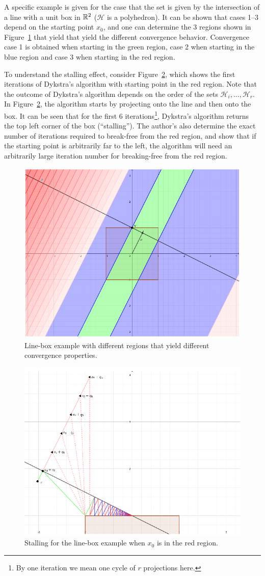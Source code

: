 \documentclass[hidelinks]{article}
\begin{document}
A specific example is given for the case that the set is given by the intersection of a line with a unit box in $\mathbb{R}^2$ ($\mathcal{H}$ is a polyhedron). It can be shown that cases 1--3 depend on the starting point $x_0$, and one can determine the 3 regions shown in Figure~\ref{fig:region} that yield that yield the different convergence behavior. Convergence case 1 is obtained when starting in the green region, case 2 when starting in the blue region and case 3 when starting in the red region.

To understand the stalling effect, consider Figure~\ref{fig:stalling}, which shows the first iterations of Dykstra's algorithm with starting point in the red region. Note that the outcome of Dykstra's algorithm depends on the order of the sets $\mathcal{H}_i,\dots,\mathcal{H}_r$. In Figure~\ref{fig:stalling}, the algorithm starts by projecting onto the line and then onto the box. It can be seen that for the first 6 iterations\footnote{By one iteration we mean one cycle of $r$ projections here.}, Dykstra's algorithm returns the top left corner of the box (``stalling''). The author's also determine the exact number of iterations required to break-free from the red region, and show that if the starting point is arbitrarily far to the left, the algorithm will need an arbitrarily large iteration number for breaking-free from the red region.
%
\begin{figure}
\includegraphics[width=0.6\linewidth]{Latex/Current Version/Figures/regions.png}\caption{Line-box example with different regions that yield different convergence properties.}\label{fig:region}
\end{figure}
%
%
\begin{figure}
\includegraphics[width=0.6\linewidth]{Latex//Current Version//Figures/stalling.png}\caption{Stalling for the line-box example when $x_0$ is in the red region.}\label{fig:stalling}
\end{figure}
%
\end{document}
